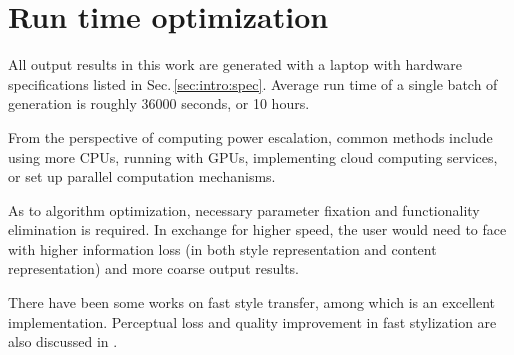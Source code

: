 
\section{Run time optimization}

All output results in this work are generated with a laptop with hardware specifications listed in Sec.\,\ref{sec:intro:spec}.
Average run time of a single batch of generation is roughly 36000 seconds, or 10 hours.

From the perspective of computing power escalation, common methods include using more CPUs,
running with GPUs, implementing cloud computing services, or set up parallel computation mechanisms.

As to algorithm optimization, necessary parameter fixation and functionality elimination is required.
In exchange for higher speed, the user would need to face with higher information loss
(in both style representation and content representation)
and more coarse output results.

There have been some works on fast style transfer, among which \cite{lengstrom2016faststyletransfer} is an excellent implementation.
Perceptual loss and quality improvement in fast stylization are also discussed in \cite{Johnson:2016hp, Ulyanov:2016wk}.
